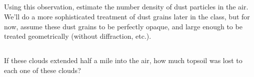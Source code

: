 \documentclass[11pt]{article}
\begin{document}
\subsection{}
\vspace{-6pt}
Using this observation, estimate the number density of dust particles in the air.
We'll do a more sophisticated
treatment of dust grains later in the class, but for now, assume these dust grains to be perfectly
opaque, and large enough to be treated geometrically (without diffraction, etc.).

\subsection{}
\vspace{-6pt}
If these clouds extended half a mile into the air, how much topsoil was lost to each one of these clouds?
\end{document}
